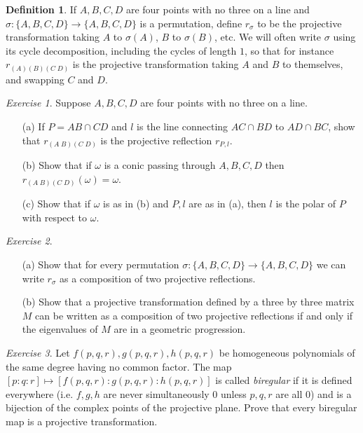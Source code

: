 \documentclass[letterpaper,11pt]{article}
\theoremstyle{definition}
\newtheorem{defn}{Definition}
\theoremstyle{remark}
\newtheorem{exer}{Exercise}
\begin{document}
\begin{defn} If $A,B,C,D$ are four points with no three on a line and $\sigma:\{A,B,C,D\} \rightarrow \{A,B,C,D\}$ is a permutation, define $r_{\sigma}$ to be the projective transformation taking $A$ to $\sigma(A)$, $B$ to $\sigma(B)$, etc. We will often write $\sigma$ using its cycle decomposition, including the cycles of length $1$, so that for instance $r_{(A)(B)(C\;D)}$ is the projective transformation taking $A$ and $B$ to themselves, and swapping $C$ and $D$.
\end{defn}

\begin{exer} Suppose $A,B,C,D$ are four points with no three on a line.
\begin{itemize}
\item[(a)] If $P = AB\cap CD$ and $l$ is the line connecting $AC\cap BD$ to $AD\cap BC$, show that $r_{(A\;B)(C\;D)}$ is the projective reflection $r_{P,l}$.

\item[(b)] Show that if $\omega$ is a conic passing through $A,B,C,D$ then $r_{(A\;B)(C\;D)}(\omega) = \omega$.

\item[(c)] Show that if $\omega$ is as in (b) and $P,l$ are as in (a), then $l$ is the polar of $P$ with respect to $\omega$.
\end{itemize}
\end{exer}

\begin{exer}
\begin{itemize}
\item[(a)] Show that for every permutation $\sigma:\{A,B,C,D\} \rightarrow \{A,B,C,D\}$ we can write $r_\sigma$ as a composition of two projective reflections.

\item[(b)] Show that a projective transformation defined by a three by three matrix $M$ can be written as a composition of two projective reflections if and only if the eigenvalues of $M$ are in a geometric progression. %
\end{itemize}
\end{exer}

\begin{exer} Let $f(p,q,r),g(p,q,r),h(p,q,r)$ be homogeneous polynomials of the same degree having no common factor. The map $[p:q:r]\mapsto [f(p,q,r):g(p,q,r):h(p,q,r)]$ is called \emph{biregular} if it is defined everywhere (i.e. $f,g,h$ are never simultaneously $0$ unless $p,q,r$ are all $0$) and is a bijection of the complex points of the projective plane. Prove that every biregular map is a projective transformation.
\end{exer}
\end{document}
